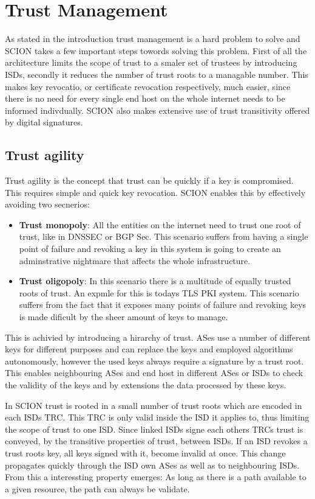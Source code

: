 \documentclass[../eva1_scion.tex]{subfiles}
\begin{document}
    \section{Trust Management}
    As stated in the introduction trust management is a hard problem to solve and SCION takes a few important steps towords solving this problem. First of all the architecture limits the scope of trust to a smaler set of trustees by introducing ISDs, secondly it reduces the number of trust roots to a managable number. This makes key revocatio, or certificate revocation respectively, much easier, since there is no need for every single end host on the whole internet needs to be informed indivdually. SCION also makes extensive use of trust transitivity offered by digital signatures. 

    \subsection{Trust agility}
    Trust agility is the concept that trust can be quickly if a key is compromised. This requires simple and quick key revocation. SCION enables this by effectively avoiding two secnerios:

    \begin{itemize}
        \item \textbf{Trust monopoly}: All the entities on the internet need to trust one root of trust, like in DNSSEC or BGP Sec. This scenario suffers from having a single point of failure and revoking a key in this system is going to create an adminstrative nightmare that affects the whole infrastructure.
        \item  \textbf{Trust oligopoly}: In this scenario there is a multitude of equally trusted roots of trust. An expmle for this is todays TLS PKI system. This scenario suffers from the fact that it exposes many points of failure and revoking keys is made dificult by the sheer amount of keys to manage.
    \end{itemize}

    This is achivied by introducing a hirarchy of trust. ASes use a number of different keys for different purposes and can replace the keys and employed algorithms autonomously, however the used keys always require a signature by a trust root. This enables neighbouring ASes and end host in different ASes or ISDs to check the validity of the keys and by extensions the data processed by these keys.

    In SCION trust is rooted in a small number of trust roots which are encoded in each ISDs TRC. This TRC is only valid inside the ISD it applies to, thus limiting the scope of trust to one ISD. Since linked ISDs signe each others TRCs trust is conveyed, by the transitive properties of trust, between ISDs. If an ISD revokes a trust roots key, all keys signed with it, become invalid at once. This change propagates quickly through the ISD own ASes as well as to neighbouring ISDs. From this a interessting property emerges: As long as there is a path available to a given resource, the path can always be validate.
\end{document}
